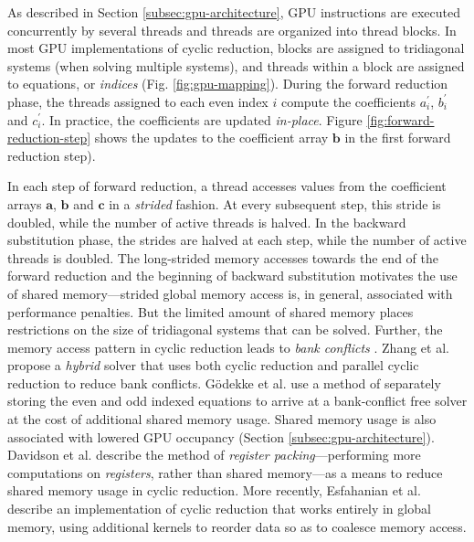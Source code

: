 \documentclass{elsarticle}
\begin{document}
As described in Section \ref{subsec:gpu-architecture},
GPU instructions are executed concurrently
by several threads and
threads are organized into thread blocks.
In most GPU implementations of cyclic reduction,
blocks are assigned to tridiagonal systems
(when solving multiple systems),
and threads within a block 
are assigned to equations, or \emph{indices}
(Fig. \ref{fig:gpu-mapping}).
During the forward reduction phase,
the threads assigned to each even index $i$
compute the coefficients
$a_i^\prime$, $b_i^\prime$ and $c_i^\prime$.
In practice, the coefficients are updated \emph{in-place}.
Figure \ref{fig:forward-reduction-step} shows the updates
to the coefficient array $\bm{b}$ in the first forward reduction step).

In each step of forward reduction,
a thread accesses values from the coefficient arrays
$\bm{a}$, $\bm{b}$ and $\bm{c}$ in a \emph{strided} fashion.
At every subsequent step,
this stride is doubled, while the number of active threads is halved.
In the backward substitution phase,
the strides are halved at each step,
while the number of active threads is doubled.
The long-strided memory accesses towards the end
of the forward reduction
and the beginning of backward substitution
motivates the use of shared memory---strided global memory access is,
in general, associated with performance penalties.
But the limited amount of shared memory places restrictions
on the size of tridiagonal systems that can be solved.
Further,
the memory access pattern in
cyclic reduction leads to \emph{bank conflicts}
\cite{Zhang2010FTS}.
Zhang et al. \cite{Zhang2010FTS} propose a
\emph{hybrid} solver
that uses both cyclic reduction and parallel cyclic reduction
to reduce bank conflicts.
G{\"o}dekke et al. \cite{GoSt11CR}
use a method of separately storing
the even and odd indexed equations
to arrive at a bank-conflict free solver
at the cost of additional shared memory usage.
Shared memory usage is also associated with
lowered GPU occupancy (Section \ref{subsec:gpu-architecture}).
Davidson et al. \cite{davidson2011register}
describe the method of
\emph{register packing}---performing more computations
on \emph{registers}, rather than shared memory---as
a means to reduce shared memory usage in cyclic reduction.
More recently, Esfahanian et al. \cite{esfahanian2014efficient}
describe an implementation of cyclic reduction
that works entirely in global memory,
using additional kernels to reorder data so as to
coalesce memory access.

\end{document}
